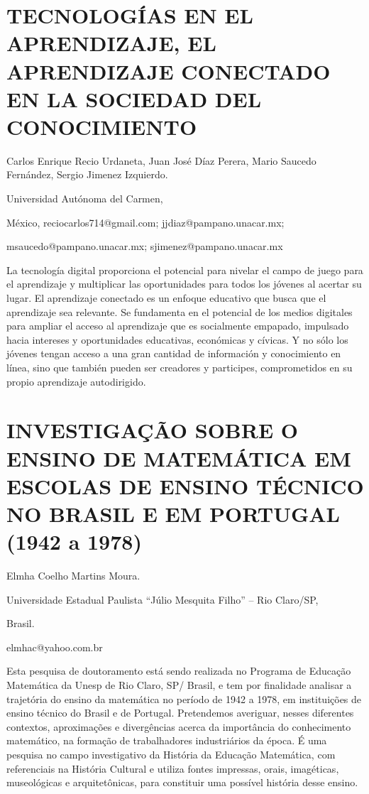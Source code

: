 \section{TECNOLOGÍAS EN EL APRENDIZAJE, EL APRENDIZAJE CONECTADO EN LA SOCIEDAD
DEL CONOCIMIENTO}

\begin{datos}

Carlos Enrique Recio Urdaneta, Juan José Díaz Perera, Mario Saucedo
Fernández, Sergio Jimenez Izquierdo.

Universidad Autónoma del Carmen,

México, reciocarlos714@gmail.com; jjdiaz@pampano.unacar.mx;

msaucedo@pampano.unacar.mx; sjimenez@pampano.unacar.mx

\end{datos}

La tecnología digital proporciona el potencial para nivelar el campo
de juego para el aprendizaje y multiplicar las oportunidades para
todos los jóvenes al acertar su lugar. El aprendizaje conectado es
un enfoque educativo que busca que el aprendizaje sea relevante. Se
fundamenta en el potencial de los medios digitales para ampliar el
acceso al aprendizaje que es socialmente empapado, impulsado hacia
intereses y oportunidades educativas, económicas y cívicas. Y no sólo
los jóvenes tengan acceso a una gran cantidad de información y conocimiento
en línea, sino que también pueden ser creadores y participes, comprometidos
en su propio aprendizaje autodirigido.


\section{INVESTIGAÇÃO SOBRE O ENSINO DE MATEMÁTICA EM ESCOLAS DE ENSINO TÉCNICO
NO BRASIL E EM PORTUGAL (1942 a 1978)}

\begin{datos}

Elmha Coelho Martins Moura.

Universidade Estadual Paulista “Júlio Mesquita Filho” – Rio Claro/SP,

Brasil. 

elmhac@yahoo.com.br 

\end{datos}

Esta pesquisa de doutoramento está sendo realizada no Programa de
Educação Matemática da Unesp de Rio Claro, SP/ Brasil, e tem por finalidade
analisar a trajetória do ensino da matemática no período de 1942 a
1978, em instituições de ensino técnico do Brasil e de Portugal. Pretendemos
averiguar, nesses diferentes contextos, aproximações e divergências
acerca da importância do conhecimento matemático, na formação de trabalhadores
industriários da época. É uma pesquisa no campo investigativo da História
da Educação Matemática, com referenciais na História Cultural e utiliza
fontes impressas, orais, imagéticas, museológicas e arquitetônicas,
para constituir uma possível história desse ensino.


